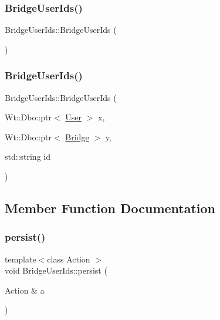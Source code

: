 \subsubsection{\texorpdfstring{Bridge\+User\+Ids()}{BridgeUserIds()}\hspace{0.1cm}{\footnotesize\ttfamily [1/2]}}
{\footnotesize\ttfamily Bridge\+User\+Ids\+::\+Bridge\+User\+Ids (\begin{DoxyParamCaption}{ }\end{DoxyParamCaption})\hspace{0.3cm}{\ttfamily [inline]}}

\mbox{\label{class_bridge_user_ids_ae493577d89b03fa58a2218ec0eee466b}} 
\subsubsection{\texorpdfstring{Bridge\+User\+Ids()}{BridgeUserIds()}\hspace{0.1cm}{\footnotesize\ttfamily [2/2]}}
{\footnotesize\ttfamily Bridge\+User\+Ids\+::\+Bridge\+User\+Ids (\begin{DoxyParamCaption}\item[{Wt\+::\+Dbo\+::ptr$<$ \hyperlink{class_user}{User} $>$}]{x,  }\item[{Wt\+::\+Dbo\+::ptr$<$ \hyperlink{class_bridge}{Bridge} $>$}]{y,  }\item[{std\+::string}]{id }\end{DoxyParamCaption})\hspace{0.3cm}{\ttfamily [inline]}}



\subsection{Member Function Documentation}
\mbox{\label{class_bridge_user_ids_a8b4bf329ea12c999cca1775ef9d981cc}} 
\subsubsection{\texorpdfstring{persist()}{persist()}}
{\footnotesize\ttfamily template$<$class Action $>$ \\
void Bridge\+User\+Ids\+::persist (\begin{DoxyParamCaption}\item[{Action \&}]{a }\end{DoxyParamCaption})\hspace{0.3cm}{\ttfamily [inline]}}



